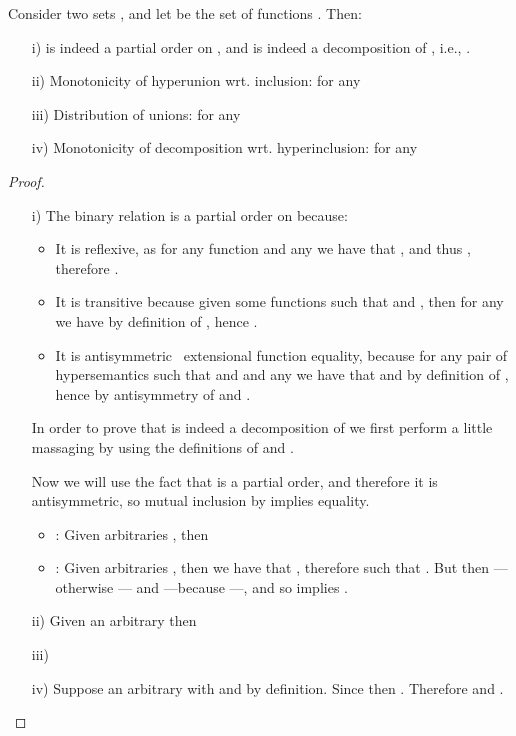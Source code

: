 Consider two sets , and let  be the set of functions . Then:
\begin{enumerate}
    \item[i)]  is indeed a partial order on , and  is indeed a decomposition of , i.e., .
    \item[ii)] Monotonicity of hyperunion wrt. inclusion: for any 

    \item[iii)] Distribution of unions: for any 

    \item[iv)] Monotonicity of decomposition wrt. hyperinclusion: for any 

\end{enumerate}

\begin{proof}\label{DEMO_HipSemDecUnion}~
\begin{enumerate}
    \item[i)] The binary relation  is a partial order on  because:
    \begin{itemize}
        \item It is reflexive, as for any function  and any  we have that , and thus , therefore .
        \item It is transitive because given some functions  such that  and , then for any  we have  by definition of , hence .
        \item It is antisymmetric \wrt\ extensional function equality, because for any pair of hypersemantics  such that  and  and any  we have that  and  by definition of , hence  by antisymmetry of  and .
    \end{itemize}
In order to prove that  is indeed a decomposition of  we first perform a little massaging by using the definitions of  and .

Now we will use the fact that  is a partial order, and therefore it is antisymmetric, so mutual inclusion by  implies equality.

\begin{itemize}
\item \underline{}: Given arbitraries ,  then

\item \underline{}: Given arbitraries ,  then we have that , therefore  such that . But then  ---otherwise --- and  ---because ---, and so  implies .
\end{itemize}
        \item[ii)] Given an arbitrary  then

\item[iii)]


\item[iv)] Suppose an arbitrary  with  and  by definition. Since  then . Therefore  and .
\end{enumerate}
\end{proof}

